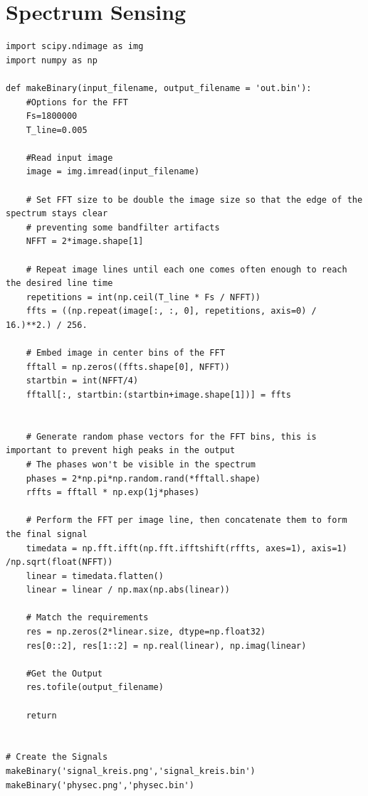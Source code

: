 \documentclass[12pt,a4paper]{article}
\begin{document}
\newpage
\section{Spectrum Sensing}
\begin{verbatim}
import scipy.ndimage as img
import numpy as np

def makeBinary(input_filename, output_filename = 'out.bin'):
    #Options for the FFT
    Fs=1800000 
    T_line=0.005
    
    #Read input image
    image = img.imread(input_filename)

    # Set FFT size to be double the image size so that the edge of the spectrum stays clear
    # preventing some bandfilter artifacts
    NFFT = 2*image.shape[1]

    # Repeat image lines until each one comes often enough to reach the desired line time
    repetitions = int(np.ceil(T_line * Fs / NFFT))
    ffts = ((np.repeat(image[:, :, 0], repetitions, axis=0) / 16.)**2.) / 256.

    # Embed image in center bins of the FFT
    fftall = np.zeros((ffts.shape[0], NFFT))
    startbin = int(NFFT/4)
    fftall[:, startbin:(startbin+image.shape[1])] = ffts


    # Generate random phase vectors for the FFT bins, this is important to prevent high peaks in the output
    # The phases won't be visible in the spectrum
    phases = 2*np.pi*np.random.rand(*fftall.shape)
    rffts = fftall * np.exp(1j*phases)

    # Perform the FFT per image line, then concatenate them to form the final signal
    timedata = np.fft.ifft(np.fft.ifftshift(rffts, axes=1), axis=1) /np.sqrt(float(NFFT))
    linear = timedata.flatten()
    linear = linear / np.max(np.abs(linear))

    # Match the requirements
    res = np.zeros(2*linear.size, dtype=np.float32)		
    res[0::2], res[1::2] = np.real(linear), np.imag(linear)				 
	
    #Get the Output
    res.tofile(output_filename)
    
    return


# Create the Signals
makeBinary('signal_kreis.png','signal_kreis.bin')
makeBinary('physec.png','physec.bin')

\end{verbatim}
\end{document}
